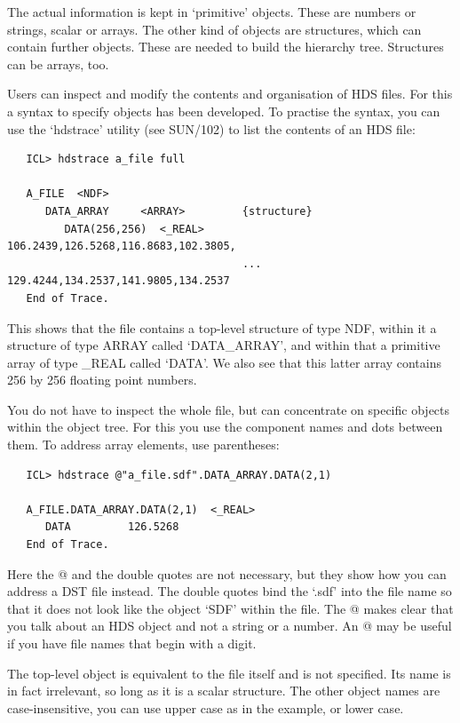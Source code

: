 \documentclass[11pt,twoside]{article}
\newcommand{\xref}[3]{#1}
\begin{document}
   The actual information is kept in `primitive' objects. These are
   numbers or strings, scalar or arrays. The other kind of objects are
   structures, which can contain further objects. These are needed to
   build the hierarchy tree. Structures can be arrays, too.

   Users can inspect and modify the contents and organisation of HDS
   files.  For this a syntax to specify objects has been developed.
   To practise the syntax, you can use the `hdstrace' utility (see
   \xref{SUN/102}{sun102}{}) to list the contents of an HDS file:

\begin{verbatim}
   ICL> hdstrace a_file full

   A_FILE  <NDF>
      DATA_ARRAY     <ARRAY>         {structure}
         DATA(256,256)  <_REAL>         106.2439,126.5268,116.8683,102.3805,
                                     ... 129.4244,134.2537,141.9805,134.2537
   End of Trace.
\end{verbatim}

   This shows that the file contains a top-level structure of
   type NDF, within it a structure of type ARRAY called `DATA\_ARRAY',
   and within that a primitive array of type \_REAL called `DATA'. We
   also see that this latter array contains 256 by 256 floating point
   numbers.

   You do not have to inspect the whole file, but can concentrate on
   specific objects within the object tree. For this you use the
   component names and dots between them. To address array elements,
   use parentheses:

\begin{verbatim}
   ICL> hdstrace @"a_file.sdf".DATA_ARRAY.DATA(2,1)

   A_FILE.DATA_ARRAY.DATA(2,1)  <_REAL>
      DATA         126.5268
   End of Trace.
\end{verbatim}

   Here the @ and the double quotes are not necessary, but they show
   how you can address a DST file instead. The double quotes bind the
   `.sdf' into the file name so that it does not look like the object
   `SDF' within the file. The @ makes clear that you talk about an HDS
   object and not a string or a number. An @ may be useful if you have
   file names that begin with a digit.

   The top-level object is equivalent to the file itself and is not
   specified. Its name is in fact irrelevant, so long as it is a
   scalar structure. The other object names are case-insensitive, you
   can use upper case as in the example, or lower case.
\end{document}

